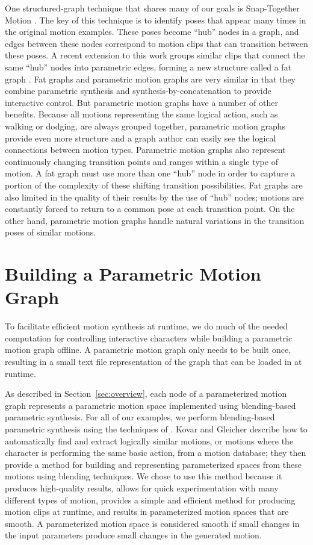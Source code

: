 \documentclass[10pt,twocolumn]{article}
\begin{document}
One structured-graph technique that shares many of our goals is Snap-Together Motion \citep{gleicher2003}. The key of this technique is to identify poses that appear many times in the original motion examples. These poses become ``hub'' nodes in a graph, and edges between these nodes correspond to motion clips that can transition between these poses. A recent extension to this work groups similar clips that connect the same ``hub'' nodes into parametric edges, forming a new structure called a fat graph \citep{shin2006}. Fat graphs and parametric motion graphs are very similar in that they combine parametric synthesis and synthesis-by-concatenation to provide interactive control. But parametric motion graphs have a number of other benefits. Because all motions representing the same logical action, such as walking or dodging, are always grouped together, parametric motion graphs provide even more structure and a graph author can easily see the logical connections between motion types. Parametric motion graphs also represent continuously changing transition points and ranges within a single type of motion. A fat graph must use more than one ``hub'' node in order to capture a portion of the complexity of these shifting transition possibilities. Fat graphs are also limited in the quality of their results by the use of ``hub'' nodes; motions are constantly forced to return to a common pose at each transition point. On the other hand, parametric motion graphs handle natural variations in the transition poses of similar motions.

\section{Building a Parametric Motion Graph}
\label{sec:building}

To facilitate efficient motion synthesis at runtime, we do much of the needed computation for controlling interactive characters while building a parametric motion graph offline. A parametric motion graph only needs to be built once, resulting in a small text file representation of the graph that can be loaded in at runtime.

As described in Section~\ref{sec:overview}, each node of a parameterized motion graph represents a parametric motion space implemented using blending-based parametric synthesis. For all of our examples, we perform blending-based parametric synthesis using the techniques of \citet{kovar2004}. Kovar and Gleicher describe how to automatically find and extract logically similar motions, or motions where the character is performing the same basic action, from a motion database; they then provide a method for building and representing parameterized spaces from these motions using blending techniques. We chose to use this method because it produces high-quality results, allows for quick experimentation with many different types of motion, provides a simple and efficient method for producing motion clips at runtime, and results in parameterized motion spaces that are smooth. A parameterized motion space is considered smooth if small changes in the input parameters produce small changes in the generated motion.
\end{document}
